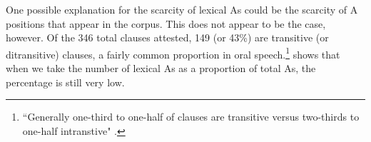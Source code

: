 \begin{table}

\caption{{A cross-linguistic comparison of lexical arguments in core grammatical roles}} 
\label{crossgeneraldist}

\end{table}


One possible explanation for the scarcity of lexical As could be the scarcity of A positions that appear in the corpus. This does not appear to be the case, however. Of the 346 total clauses attested, 149 (or 43{\%}) are transitive (or ditransitive) clauses, a fairly common proportion in oral speech.\footnote{``Generally one-third to one-half of clauses are transitive versus two-thirds to one-half intranstive"  \citep[63--64]{dubois2003a}.}  shows that when we take the number of lexical As as a proportion of total As, the percentage is still very low.

